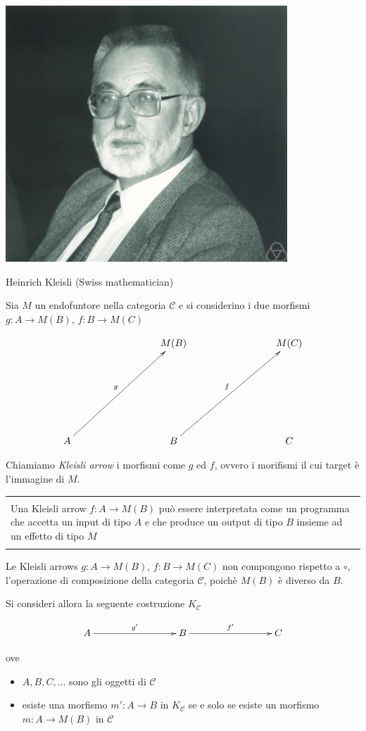 \documentclass[12pt]{article}
\theoremstyle{definition}
\newenvironment{demo}
    {\begin{center}
    \begin{tabular}{|p{0.9\textwidth}|}
    \hline\\
    }
    {
    \\\\\hline
    \end{tabular}
    \end{center}
    }
\begin{document}
\begin{center}
\includegraphics[scale=0.5]{kleisli}

Heinrich Kleisli (Swiss mathematician)
\end{center}

Sia $M$ un endofuntore nella categoria $\mathcal{C}$ e si considerino i due morfismi $g: A \rightarrow M(B)$, $f: B \rightarrow M(C)$

\[
\xymatrixrowsep{3cm}
\xymatrixcolsep{3cm}
\xymatrix{
  & M(B) & M(C) \\
  A \ar[ur]^g & B \ar[ur]^f & C
}
\]

Chiamiamo \emph{Kleisli arrow} i morfismi come $g$ ed $f$, ovvero i morifismi il cui target è l'immagine di $M$.

\begin{demo}
Una Kleisli arrow $f: A \rightarrow M(B)$ può essere interpretata come un programma che accetta un input di tipo $A$ e che produce un output di tipo $B$ insieme ad un effetto di tipo $M$
\end{demo}

Le Kleisli arrows $g: A \rightarrow M(B)$, $f: B \rightarrow M(C)$ non compongono rispetto a $\circ$, l'operazione di composizione della categoria $\mathcal{C}$,
poichè $M(B)$ è diverso da $B$.

Si consideri allora la seguente costruzione $K_{\mathcal{C}}$

\[
\xymatrixrowsep{3cm}
\xymatrixcolsep{3cm}
\xymatrix{
  A \ar[r]^{g'} & B \ar[r]^{f'} & C
}
\]

ove

\begin{itemize}
  \item $A, B, C, \ldots$ sono gli oggetti di $\mathcal{C}$
  \item esiste una morfismo $m': A \rightarrow B$ in $K_{\mathcal{C}}$ se e solo se esiste un morfismo $m: A \rightarrow M(B)$ in $\mathcal{C}$
\end{itemize}
\end{document}

